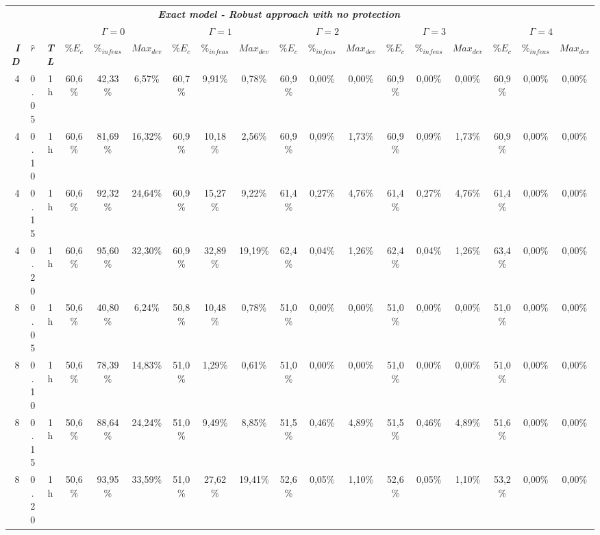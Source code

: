 \documentclass[final,5p,times,twocolumn]{elsarticle}
\begin{document}
\begin{table*}[!htb]
\centering
\tabcolsep 3.7pt
\scriptsize
\begin{tabular}{rccccccccccccccccc}
& & \multicolumn{14}{c}{\textbf{\textit{Exact model - Robust approach with no protection}}} \\
\cline{4-18}
& & & \multicolumn{3}{c}{\textbf{\textit{$\Gamma = 0$}}} & \multicolumn{3}{c}{\textbf{\textit{$\Gamma = 1$}}} &  \multicolumn{3}{c}{\textbf{\textit{$\Gamma = 2$}}} & \multicolumn{3}{c}{\textbf{\textit{$\Gamma = 3$}}} & \multicolumn{3}{c}{\textbf{\textit{$\Gamma = 4$}}} \\ 
\hline
\textbf{\textit{ID}} & \textbf{\textit{$\hat{r}$}} & \textbf{\textit{TL}} & \textbf{\textit{$\%E_c$}} & $\%_{infeas}$ &	$Max_{dev}$ & \textbf{\textit{$\%E_c$}} & $\%_{infeas}$ &	$Max_{dev}$ & \textbf{\textit{$\%E_c$}} & $\%_{infeas}$ &	$Max_{dev}$ & \textbf{\textit{$\%E_c$}} & $\%_{infeas}$ &	$Max_{dev}$ & \textbf{\textit{$\%E_c$}} & $\%_{infeas}$ &	$Max_{dev}$ \\ 
\hline
4 & 0.05 & 1h & 60,6\% & 42,33\% & 6,57\% & 60,7\% & 9,91\% & 0,78\% & 60,9\% & 0,00\% & 0,00\% & 60,9\% & 0,00\% & 0,00\% & 60,9\% & 0,00\% & 0,00\%    \\ 
4 & 0.10 & 1h & 60,6\% & 81,69\% & 16,32\% & 60,9\% & 10,18\% & 2,56\% & 60,9\% & 0,09\% & 1,73\% & 60,9\% & 0,09\% & 1,73\% & 60,9\% & 0,00\% & 0,00\%  \\ 
4 & 0.15 & 1h & 60,6\% & 92,32\% & 24,64\% & 60,9\% & 15,27\% & 9,22\% & 61,4\% & 0,27\% & 4,76\% & 61,4\% & 0,27\% & 4,76\% & 61,4\% & 0,00\% & 0,00\%  \\ 
4 & 0.20 & 1h & 60,6\% & 95,60\% & 32,30\% & 60,9\% & 32,89\% & 19,19\% & 62,4\% & 0,04\% & 1,26\% & 62,4\% & 0,04\% & 1,26\% & 63,4\% & 0,00\% & 0,00\% \\ 
8 & 0.05 & 1h & 50,6\% & 40,80\% &  6,24\% & 50,8\% & 10,48\% &  0,78\% & 51,0\% & 0,00\% & 0,00\% & 51,0\% & 0,00\% & 0,00\% & 51,0\% & 0,00\% & 0,00\% \\ 
8 & 0.10 & 1h & 50,6\% & 78,39\% & 14,83\% & 51,0\% & 1,29\% &  0,61\% & 51,0\% & 0,00\% & 0,00\% & 51,0\% & 0,00\% & 0,00\% & 51,0\% & 0,00\% & 0,00\%  \\ 
8 & 0.15 & 1h & 50,6\% & 88,64\% & 24,24\% & 51,0\% & 9,49\% &  8,85\% & 51,5\% & 0,46\% & 4,89\% & 51,5\% & 0,46\% & 4,89\% & 51,6\% & 0,00\% & 0,00\%  \\ 
8 & 0.20 & 1h & 50,6\% & 93,95\% & 33,59\% & 51,0\% & 27,62\% & 19,41\% & 52,6\% & 0,05\% & 1,10\% & 52,6\% & 0,05\% & 1,10\% & 53,2\% & 0,00\% & 0,00\% \\ 

\end{tabular}
\end{table*}
\end{document}
